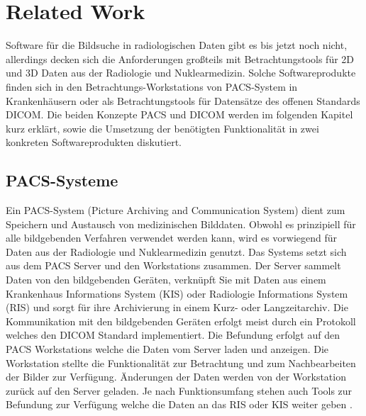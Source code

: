 
\section{Related Work}
\label{sec:relatedWork}
Software für die Bildsuche in radiologischen Daten gibt es bis jetzt noch nicht,  
allerdings decken sich die Anforderungen großteils mit Betrachtungstools für 2D und 3D Daten aus der Radiologie und Nuklearmedizin.
Solche Softwareprodukte finden sich in den Betrachtungs-Workstations von PACS-System in Krankenhäusern oder als Betrachtungstools für Datensätze des offenen Standards DICOM.
Die beiden Konzepte PACS und DICOM werden im folgenden Kapitel kurz erklärt, sowie die Umsetzung der benötigten Funktionalität in zwei konkreten Softwareprodukten diskutiert.

\subsection{PACS-Systeme}
\label{sec:PACS-Systeme}
Ein PACS-System (Picture Archiving and Communication System) dient zum Speichern und Austausch von medizinischen Bilddaten.
Obwohl es prinzipiell für alle bildgebenden Verfahren verwendet werden kann,
wird es vorwiegend für Daten aus der Radiologie und Nuklearmedizin genutzt.
%
Das Systems setzt sich aus dem PACS Server und den Workstations zusammen.
Der Server sammelt Daten von den bildgebenden Geräten,
 verknüpft Sie mit Daten aus einem Krankenhaus Informations System (KIS) oder Radiologie Informations System (RIS) und sorgt für ihre Archivierung in einem Kurz- oder Langzeitarchiv. 
Die Kommunikation mit den bildgebenden Geräten erfolgt meist durch ein Protokoll welches den DICOM Standard implementiert.
%
Die Befundung erfolgt auf den PACS Workstations welche die Daten vom Server laden und anzeigen.
Die Workstation stellte die Funktionalität zur Betrachtung und zum Nachbearbeiten der Bilder zur Verfügung.
Änderungen der Daten werden von der Workstation zurück auf den Server geladen.
Je nach Funktionsumfang stehen auch Tools zur Befundung zur Verfügung welche die Daten an das RIS oder KIS weiter geben \cite{pacs}.


